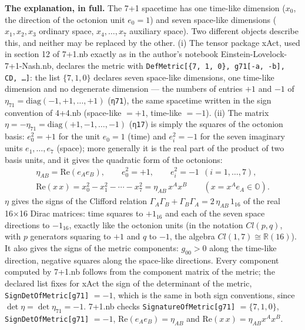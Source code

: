 \documentclass[10pt,a4paper]{article}
\begin{document}
\textbf{The explanation, in full.} The 7+1 spacetime has one time-like dimension ($x_0$, the direction of the octonion unit $e_0=1$) and seven space-like dimensions ($x_1,x_2,x_3$ ordinary space, $x_4,\dots,x_7$ auxiliary space). Two different objects describe this, and neither may be replaced by the other. (i) The tensor package xAct, used in section 12 of 7+1.nb exactly as in the author’s notebook Einstein-Lovelock-7+1-Nash.nb, declares the metric with \texttt{DefMetric[\{7, 1, 0\}, g71[-a, -b], CD, …]}: the list $\{7,1,0\}$ declares seven space-like dimensions, one time-like dimension and no degenerate dimension — the numbers of entries $+1$ and $-1$ of $\eta_{71}=\mathrm{diag}(-1,+1,\dots,+1)$ (\texttt{η71}), the same spacetime written in the sign convention of 4+4.nb (space-like $=+1$, time-like $=-1$). (ii) The matrix $\eta=-\eta_{71}=\mathrm{diag}(+1,-1,\dots,-1)$ (\texttt{η17}) is simply the squares of the octonion basis: $e_0^2=+1$ for the unit $e_0=1$ (time) and $e_i^2=-1$ for the seven imaginary units $e_1,\dots,e_7$ (space); more generally it is the real part of the product of two basis units, and it gives the quadratic form of the octonions:
\begin{gather*}
\eta_{AB}=\mathrm{Re}(e_Ae_B),\qquad e_0^2=+1,\qquad e_i^2=-1\ \ (i=1,\dots,7),\\ \mathrm{Re}(x\,x)=x_0^2-x_1^2-\cdots-x_7^2=\eta_{AB}\,x^Ax^B\qquad (x=x^Ae_A\in\mathbb O).
\end{gather*}
$\eta$ gives the signs of the Clifford relation $\Gamma_A\Gamma_B+\Gamma_B\Gamma_A=2\,\eta_{AB}\,1_{16}$ of the real 16×16 Dirac matrices: time squares to $+1_{16}$ and each of the seven space directions to $-1_{16}$, exactly like the octonion units (in the notation $Cl(p,q)$, with $p$ generators squaring to $+1$ and $q$ to $-1$, the algebra $Cl(1,7)\cong\mathbb R(16)$). It also gives the signs of the metric components: $g_{00}>0$ along the time-like direction, negative squares along the space-like directions. Every component computed by 7+1.nb follows from the component matrix of the metric; the declared list fixes for xAct the sign of the determinant of the metric, \texttt{SignDetOfMetric[g71]} $=-1$, which is the same in both sign conventions, since $\det \eta=\det \eta_{71}=-1$. 7+1.nb checks \texttt{SignatureOfMetric[g71]} $=\{7,1,0\}$, \texttt{SignDetOfMetric[g71]} $=-1$, $\mathrm{Re}(e_Ae_B)=\eta_{AB}$ and $\mathrm{Re}(x\,x)=\eta_{AB}x^Ax^B$.
\end{document}
